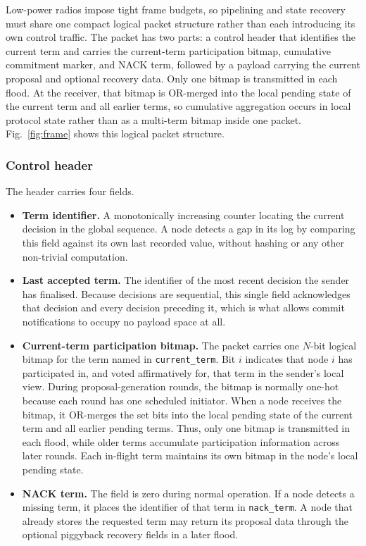 \documentclass[journal]{IEEEtran}
\begin{document}
Low-power radios impose tight frame budgets, so pipelining and state
recovery must share one compact logical packet structure rather than each
introducing its own control traffic. The packet has two parts: a control
header that identifies the current term and carries the current-term
participation bitmap, cumulative commitment marker, and NACK term, followed
by a payload carrying the current proposal and optional recovery data. Only
one bitmap is transmitted in each flood. At the receiver, that bitmap is
OR-merged into the local pending state of the current term and all earlier
terms, so cumulative aggregation occurs in local protocol state rather than
as a multi-term bitmap inside one packet. Fig.~\ref{fig:frame} shows this
logical packet structure.

\subsubsection{Control header}
The header carries four fields.

\begin{itemize}
\item \textbf{Term identifier.} A monotonically increasing counter
locating the current decision in the global sequence. A node detects a gap
in its log by comparing this field against its own last recorded value,
without hashing or any other non-trivial computation.

\item \textbf{Last accepted term.} The identifier of the most recent
decision the sender has finalised. Because decisions are sequential, this
single field acknowledges that decision and every decision preceding it,
which is what allows commit notifications to occupy no payload space at
all.

\item \textbf{Current-term participation bitmap.}
The packet carries one $N$-bit logical bitmap for the term named in
\texttt{current\_term}. Bit $i$ indicates that node $i$ has participated in,
and voted affirmatively for, that term in the sender's local view. During
proposal-generation rounds, the bitmap is normally one-hot because each
round has one scheduled initiator. When a node receives the bitmap, it
OR-merges the set bits into the local pending state of the current term and
all earlier pending terms. Thus, only one bitmap is transmitted in each
flood, while older terms accumulate participation information across later
rounds. Each in-flight term maintains its own bitmap in the node's local
pending state.

\item \textbf{NACK term.}
The field is zero during normal operation. If a node detects a missing
term, it places the identifier of that term in \texttt{nack\_term}. A node
that already stores the requested term may return its proposal data through
the optional piggyback recovery fields in a later flood.
\end{itemize}
\end{document}
